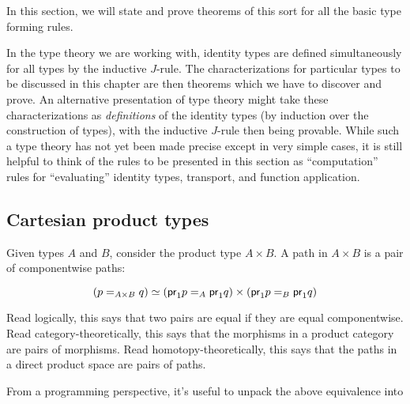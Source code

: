 In this section, we will state and prove theorems of this sort for all the basic type forming rules.

\begin{rmk}
  In the type theory we are working with, identity types are defined simultaneously for all types by the inductive $J$-rule.
  The characterizations for particular types to be discussed in this chapter are then theorems which we have to discover and prove.
  An alternative presentation of type theory might take these characterizations as \emph{definitions} of the identity types (by induction over the construction of types), with the inductive $J$-rule then being provable.
  While such a type theory has not yet been made precise except in very simple cases, it is still helpful to think of the rules to be presented in this section as ``computation'' rules for ``evaluating'' identity types, transport, and function application.
\end{rmk}

\subsection{Cartesian product types}

Given types $A$ and $B$, consider the product type $A \times B$.  
A path in $A \times B$ is a pair of componentwise paths:

\[
\eqv{(\id[A \times B] p q)}{(\id[A]{\proj{1} p}{\proj{1} q}) \times (\id[B]{\proj{1} p}{\proj{1} q})}
\]

Read logically, this says that two pairs are equal if they are equal
componentwise.  Read category-theoretically, this says that the
morphisms in a product category are pairs of morphisms.  Read
homotopy-theoretically, this says that the paths in a direct product
space are pairs of paths.  

From a programming perspective, it's useful to unpack the above
equivalence into 

\newcommand{\pairpath}{\mathsf{pair}^{\mathord{=}}}
\newcommand{\projpath}[1]{\proj{#1}^{\mathord{=}}}

